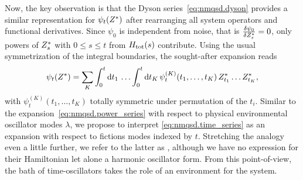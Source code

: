 Now, the key observation is that the Dyson series~\ref{eq:nmqsd.dyson} provides a similar representation for $\psitZ$ after rearranging all system operators and functional derivatives.
Since $\psi_0$ is independent from noise, that is $\frac{\delta\psi_0}{\delta {Z}^*_s} = 0$, only powers of ${Z}^*_s$ with $0 \le s \le t$ from $H_\mathrm{tot}(s)$ contribute.
Using the usual symmetrization of the integral boundaries, the sought-after expansion reads
\begin{equation}
  \psitZ = \sum_K \intl{0}{t}{t_1} \ldots \intl{0}{t}{t_K} \psi_t^{(K)}(t_1, \ldots, t_K) \, \ZZ_{t_1} \ldots \ZZ_{t_K},
  \label{eq:nmqsd.time_series}
\end{equation}
with $\psi_t^{(K)}(t_1, \ldots, t_K)$ totally symmetric under permutation of the $t_i$.
Similar to the expansion~\ref{eq:nmqsd.power_series} with respect to physical environmental oscillator modes $\lambda$, we propose to interpret \autoref{eq:nmqsd.time_series} as an expansion with respect to fictions modes indexed by $t$.
Stretching the analogy even a little further, we refer to the latter as , although we have no expression for their  Hamiltonian let alone a harmonic oscillator form.
From this point-of-view, the bath of time-oscillators takes the role of an environment for the system.

